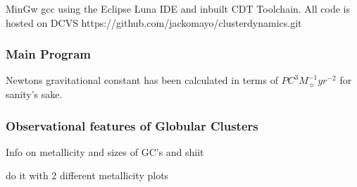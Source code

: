 \documentclass[%
 aip,
 jmp,%
 amsmath,amssymb,
 reprint,%
]{revtex4-1}
\begin{document}
MinGw gcc using the Eclipse Luna IDE and inbuilt CDT Toolchain. All code is hosted on DCVS https://github.com/jackomayo/clusterdynamics.git


\subsubsection{Main Program}\label{code}
Newtons gravitational constant has been calculated in terms of $PC^{3}M_{\sun}^{-1}yr^{-2}$ for sanity's sake.

%

\subsubsection{Observational features of Globular Clusters}\label{observed}
Info on metallicity and sizes of GC's and shiit

do it with 2 different metallicity plots 
\end{document}
